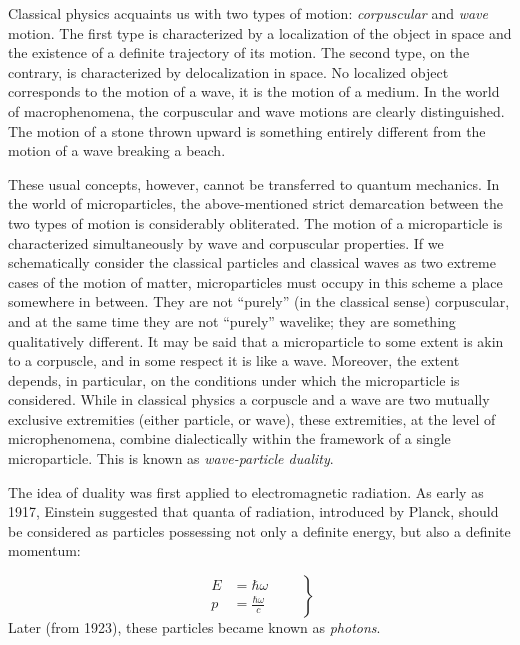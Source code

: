 \documentclass[a4paper,sfsidenotes,colorlinks=true]{tufte-book}
\numberwithin{equation}{section}
\numberwithin{figure}{section}
\begin{document}
Classical physics  acquaints
us with two types of motion: \emph{corpuscular} and \emph{wave}
motion. The first type is characterized by a localization of the
object in space and the existence of a definite trajectory of its
motion. The second type, on the contrary, is characterized by
delocalization in space. No localized object corresponds to the motion
of a wave, it is the motion of a medium. In the world of
macrophenomena, the corpuscular and wave motions are clearly
distinguished. The motion of a stone thrown upward is something
entirely different from the motion of a wave breaking a beach.

These usual concepts, however, cannot be transferred to quantum
mechanics. In the world of microparticles, the above-mentioned strict
demarcation between the two types of motion is considerably
obliterated. The motion of a microparticle is characterized
simultaneously by wave and corpuscular properties. If we schematically
consider the classical particles and classical waves as two extreme
cases of the motion of matter, microparticles must occupy in this
scheme a place somewhere in between. They are not ``purely'' (in the
classical sense) corpuscular, and at the same time they are not
``purely'' wavelike; they are something qualitatively different. It may
be said that a microparticle to some extent is akin to a corpuscle,
and in some respect it is like a wave. Moreover, the extent depends,
in particular, on the conditions under which the microparticle is
considered. While in classical physics a corpuscle and a wave are two
mutually exclusive extremities (either particle, or wave), these
extremities, at the level of microphenomena, combine dialectically
within the framework of a single microparticle. This is known as
\emph{wave-particle duality}.

The idea of duality was first applied to electromagnetic radiation. As
early as 1917, Einstein suggested that quanta of radiation, introduced
by Planck, should be considered as particles possessing not only a
definite energy, but also a definite momentum: 
\addtocounter{equation}{1}
\begin{equation}%
\left.
\begin{split}
E & = \hbar \omega\\
p & = \frac{\hbar \omega}{c}
\end{split}
\quad \quad \right\}
\label{eq-2.10} 
\end{equation}
Later (from 1923), these particles became known as \emph{photons}.  
\end{document}
